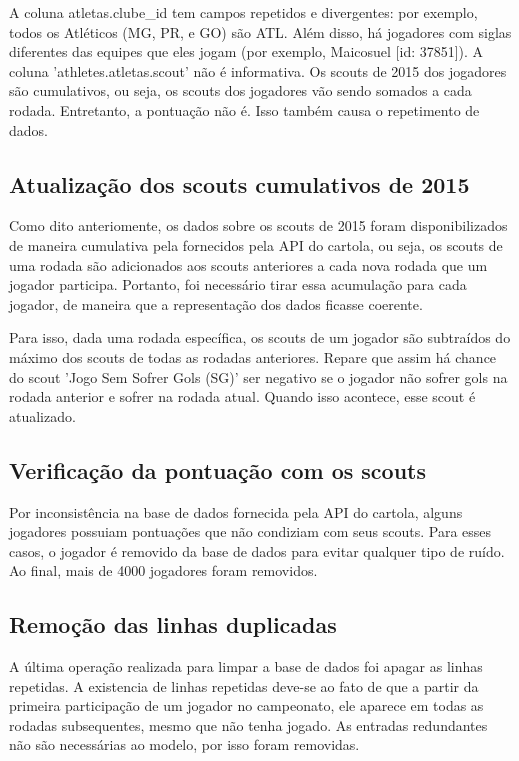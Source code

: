 \documentclass[conference]{IEEEtran}
\begin{document}
A  coluna atletas.clube\_id  tem campos  repetidos e  divergentes: por
exemplo, todos os Atléticos (MG, PR, e GO) são ATL. Além disso, há
jogadores  com  siglas diferentes  das  equipes  que eles  jogam  (por
exemplo,  Maicosuel [id:  37851]).  A coluna  'athletes.atletas.scout'
não é informativa. Os scouts de 2015 dos jogadores são cumulativos,
ou seja,  os scouts dos  jogadores vão  sendo somados a  cada rodada.
Entretanto, a pontuação não é. Isso também causa o repetimento de
dados.

\subsection{Atualização dos scouts cumulativos de 2015}

Como  dito  anteriomente, os  dados  sobre  os  scouts de  2015  foram
disponibilizados  de maneira  cumulativa pela  fornecidos pela  API do
cartola, ou seja, os scouts de  uma rodada são adicionados aos scouts
anteriores a cada nova rodada  que um jogador participa. Portanto, foi
necessário tirar essa acumulação para  cada jogador, de maneira que
a representação dos dados ficasse coerente.

Para isso, dada  uma rodada específica, os scouts de  um jogador são
subtraídos  do máximo  dos scouts  de todas  as rodadas  anteriores.
Repare que assim  há chance do scout 'Jogo Sem  Sofrer Gols (SG)' ser
negativo se o jogador não sofrer  gols na rodada anterior e sofrer na
rodada atual. Quando isso acontece, esse scout é atualizado.

\subsection{Verificação da pontuação com os scouts}

Por inconsistência  na base de  dados fornecida pela API  do cartola,
alguns  jogadores possuiam  pontuações que  não condiziam  com seus
scouts. Para esses casos, o jogador  é removido da base de dados para
evitar qualquer tipo de ruído. Ao final, mais de 4000 jogadores foram
removidos.

\subsection{Remoção das linhas duplicadas}

A última operação realizada para limpar  a base de dados foi apagar
as  linhas repetidas.  A  existencia de  linhas  repetidas deve-se  ao
fato  de que  a partir  da primeira  participação de  um jogador  no
campeonato, ele  aparece em todas  as rodadas subsequentes,  mesmo que
não tenha jogado.  As entradas redundantes não  são necessárias ao
modelo, por isso foram removidas.
\end{document}
